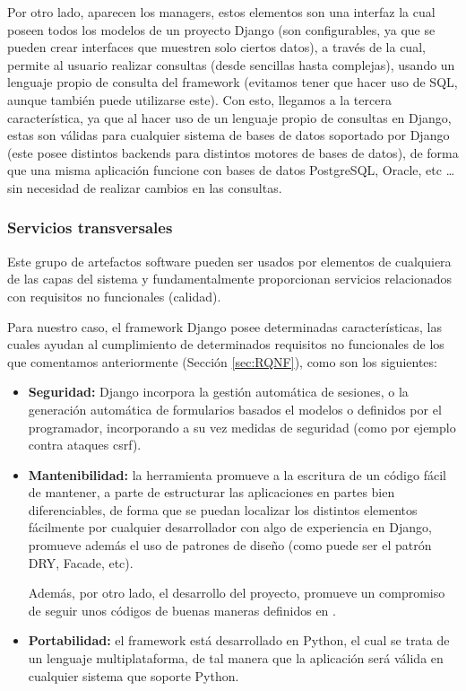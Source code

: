 Por otro lado, aparecen los managers, estos elementos son una interfaz la cual
poseen todos los modelos de un proyecto Django (son configurables, ya que se
pueden crear interfaces que muestren solo ciertos datos), a través de la cual,
permite al usuario realizar consultas (desde sencillas hasta complejas), usando
un lenguaje propio de consulta del framework (evitamos tener que hacer uso de
SQL, aunque también puede utilizarse este). Con esto, llegamos a la tercera
característica, ya que al hacer uso de un lenguaje propio de consultas en Django,
estas son válidas para cualquier sistema de bases de datos soportado por Django
(este posee distintos backends para distintos motores de bases de datos), de
forma que una misma aplicación funcione con bases de datos PostgreSQL, Oracle,
etc \ldots sin necesidad de realizar cambios en las consultas.
\subsubsection{Servicios transversales}
Este grupo de artefactos software pueden ser usados por elementos de cualquiera
de las capas del sistema y fundamentalmente proporcionan servicios relacionados
con requisitos no funcionales (calidad).

Para nuestro caso, el framework Django posee determinadas características, las
cuales ayudan al cumplimiento de determinados requisitos no funcionales de los
que comentamos anteriormente (Sección \ref{sec:RQNF}), como son los siguientes:
\begin{itemize}
    \item \textbf{Seguridad:} Django incorpora la gestión automática de
        sesiones, o la generación automática de formularios basados el modelos o
        definidos por el programador, incorporando a su vez medidas de seguridad
        (como por ejemplo contra ataques csrf).
    \item \textbf{Mantenibilidad:} la herramienta promueve a la escritura de
        un código fácil de mantener, a parte de estructurar las aplicaciones en
        partes bien diferenciables, de forma que se puedan localizar los
        distintos elementos fácilmente por cualquier desarrollador con algo de
        experiencia en Django, promueve además el uso de patrones de diseño
        (como puede ser el patrón DRY, Facade, etc).
        
        Además, por otro lado, el desarrollo del proyecto, promueve un
        compromiso de seguir unos códigos de buenas maneras definidos en
        \cite{pep8}.
    \item \textbf{Portabilidad:} el framework está desarrollado en Python, el
        cual se trata de un lenguaje multiplataforma, de tal manera que la
        aplicación será válida en cualquier sistema que soporte Python.
\end{itemize}


